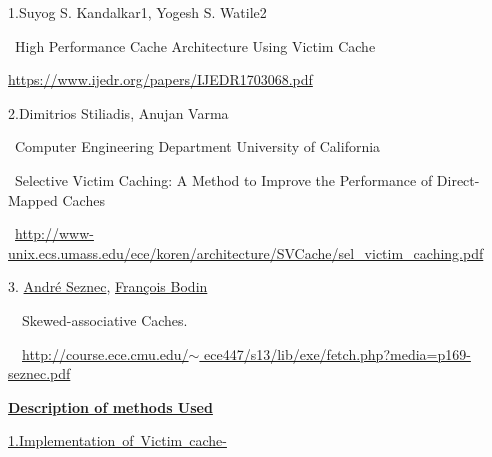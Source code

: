 \documentclass[12pt]{article}
\begin{document}
1.Suyog S. Kandalkar1, Yogesh S. Watile2\par

\  High Performance Cache Architecture Using Victim Cache\par

  \href{https://www.ijedr.org/papers/IJEDR1703068.pdf}{https://www.ijedr.org/papers/IJEDR1703068.pdf}\par

2.Dimitrios Stiliadis, Anujan Varma \par

\  Computer Engineering Department University of California \par

\  Selective Victim Caching: A Method to Improve the Performance of Direct-Mapped Caches \par

\  \href{http://www-unix.ecs.umass.edu/ece/koren/architecture/SVCache/sel_victim_caching.pdf}{http://www-unix.ecs.umass.edu/ece/koren/architecture/SVCache/sel\_victim\_caching.pdf}\par

3. \href{https://www.researchgate.net/scientific-contributions/25489304_Andre_Seznec}{André Seznec}, \href{https://www.researchgate.net/profile/Francois_Bodin2}{François Bodin}\par

\ \  Skewed-associative Caches.\par

\ \  \href{http://course.ece.cmu.edu/~ece447/s13/lib/exe/fetch.php?media=p169-seznec.pdf}{http://course.ece.cmu.edu/$ \sim $ ece447/s13/lib/exe/fetch.php?media=p169-seznec.pdf}\par




\newpage
{\fontsize{22pt}{26.4pt}\selectfont \textbf{\uline{Description of methods Used }}\par}\par


\vspace{\baselineskip}
{\fontsize{16pt}{19.2pt}\selectfont \uline{1.Implementation\ of\ Victim\ cache-    }\par}\par
\end{document}
